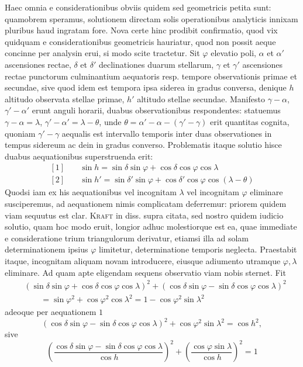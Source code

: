 Haec omnia e considerationibus obviis quidem sed geometricis petita sunt: quamobrem speramus, solutionem directam solis operationibus analyticis innixam pluribus haud ingratam fore. Nova certe hinc prodibit confirmatio, quod vix quidquam e considerationibus geometricis hauriatur, quod non possit aeque concinne per analysin erui, si modo scite tractetur.
Sit $\varphi$ elevatio poli, $\alpha$ et $\alpha'$ ascensiones rectae, $\delta$ et $\delta'$ declinationes duarum stellarum, $\gamma$ et $\gamma'$ ascensiones rectae punctorum culminantium aequatoris resp. tempore observationis primae et secundae, sive quod idem est tempora ipsa siderea in gradus conversa, denique $h$ altitudo observata stellae primae, $h'$ altitudo stellae secundae. Manifesto $\gamma-\alpha$, $\gamma'-\alpha'$ erunt anguli horarii, duabus observationibus respondentes: statuemus $\gamma-\alpha=\lambda$, $\gamma'-\alpha'=\lambda-\theta$, unde $\theta=\alpha'-\alpha-(\gamma'-\gamma)$ erit quantitas cognita, quoniam $\gamma'-\gamma$ aequalis est intervallo temporis inter duas observationes in tempus sidereum ac dein in gradus converso. Problematis itaque solutio hisce duabus aequationibus superstruenda erit:
\[
\begin{array}{rl}
{}[1]\quad&\sin h=\sin\delta\sin\varphi+\cos\delta\cos\varphi\cos\lambda\\
{}[2]\quad&\sin h'=\sin\delta'\sin\varphi+\cos\delta'\cos\varphi\cos(\lambda-\theta)
\end{array}
\]
Quodsi iam ex his aequationibus vel incognitam $\lambda$ vel incognitam $\varphi$ eliminare susciperemus, ad aequationem nimis complicatam deferremur: priorem quidem viam sequutus est clar. \textsc{Kraft} in diss. supra citata, sed nostro quidem iudicio solutio, quam hoc modo eruit, longior adhuc molestiorque est ea, quae immediate e consideratione trium triangulorum derivatur, etiamsi illa ad solam determinationem ipsius $\varphi$ limitetur, determinatione temporis neglecta. Praestabit itaque, incognitam aliquam novam introducere, eiusque adiumento utramque $\varphi,\lambda$ eliminare. Ad quam apte eligendam sequens observatio viam nobis sternet. Fit
\[
\begin{aligned}
&(\sin\delta\sin\varphi+\cos\delta\cos\varphi\cos\lambda)^2+(\cos\delta\sin\varphi-\sin\delta\cos\varphi\cos\lambda)^2\\
&\qquad=\sin\varphi^2+\cos\varphi^2\cos\lambda^2=1-\cos\varphi^2\sin\lambda^2
\end{aligned}
\]
adeoque per aequationem $1$
\[
(\cos\delta\sin\varphi-\sin\delta\cos\varphi\cos\lambda)^2+\cos\varphi^2\sin\lambda^2=\cos h^2,
\]
sive
\[
\left(\frac{\cos\delta\sin\varphi-\sin\delta\cos\varphi\cos\lambda}{\cos h}\right)^2+\left(\frac{\cos\varphi\sin\lambda}{\cos h}\right)^2=1
\]


